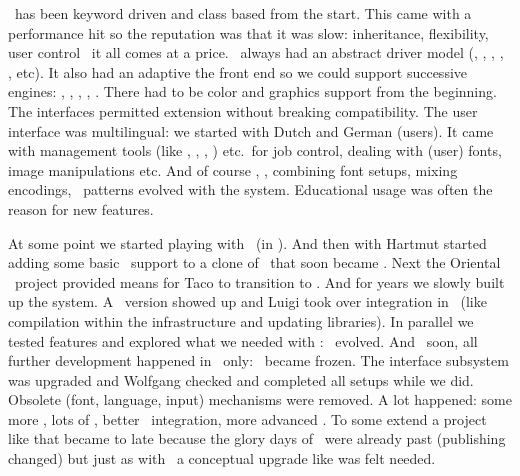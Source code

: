 \startitemize
\startitem
    \CONTEXT\ has been keyword driven and class based from the start.
\stopitem
\startitem
    This came with a performance hit so the reputation was that it was slow:
    inheritance, flexibility, user control \unknown\ it all comes at a price.
\stopitem
\startitem
    \CONTEXT\ always had an abstract driver model (\DVIPS, \DVIPSONE, \DVIWINDO,
    \ACROBAT, \PDFTEX, etc).
\stopitem
\startitem
    It also had an adaptive the front end so we could support successive engines:
    \TEX, \ETEX, \PDFTEX, \ALEPH, \XETEX.
\stopitem
\startitem
    There had to be color and graphics support from the beginning.
\stopitem
\startitem
    The interfaces permitted extension without breaking compatibility. The user
    interface was multilingual: we started with Dutch and German (users).
\stopitem
\startitem
    It came with management tools (like \TEXEXEC, \TEXUTIL, \TEXFONT, \TEXMFSTART) etc.\
    for job control, dealing with (user) fonts, image manipulations etc.
\stopitem
\startitem
    And of course \METAPOST, \XML, combining font setups, mixing encodings, \UTF\
    patterns evolved with the system.
\stopitem
\startitem
    Educational usage was often the reason for new features.
\stopitem
\stopitemize

\stoptitle

\starttitle[title=MKIV]

\startitemize
\startitem
    At some point we started playing with \LUA\ (in \SCITE).
\stopitem
\startitem
    And then with Hartmut started adding some basic \LUA\ support to a clone of
    \PDFTEX\ that soon became \LUATEX.
\stopitem
\startitem
    Next the Oriental \TEX\ project provided means for Taco to transition to
    \CCODE .
\stopitem
\startitem
    And for years we slowly built up the system. A \LUAJITTEX\ version showed up
    and Luigi took over integration in \TEXLIVE\ (like compilation within the
    infrastructure and updating libraries).
\stopitem
\startitem
    In parallel we tested features and explored what we needed with \CONTEXT:
    \MKIV\ evolved.
\stopitem
\startitem
    And \unknown\ soon, all further development happened in \MKIV\ only: \MKII\
    became frozen.
\stopitem
\startitem
    The interface subsystem was upgraded and Wolfgang checked and completed all
    setups while we did. Obsolete (font, language, input) mechanisms were
    removed.
\stopitem
\startitem
    A lot happened: some more \TEX, lots of \LUA, better \METAPOST\ integration,
    more advanced \XML.
\stopitem
\startitem
    To some extend a project like that became to late because the glory days of
    \TEX\ were already past (publishing changed) but just as with \PDFTEX\ a
    conceptual upgrade like was felt needed.
\stopitem
\stopitemize

